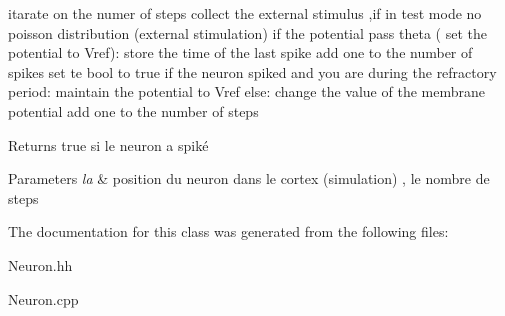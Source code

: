 itarate on the numer of steps collect the external stimulus ,if in test mode no poisson distribution (external stimulation) if the potential pass theta ( set the potential to Vref)\-: store the time of the last spike add one to the number of spikes set te bool to true if the neuron spiked and you are during the refractory period\-: maintain the potential to Vref else\-: change the value of the membrane potential add one to the number of steps \begin{DoxyReturn}{Returns}
true si le neuron a spiké 
\end{DoxyReturn}

\begin{DoxyParams}{Parameters}
{\em la} & position du neuron dans le cortex (simulation) , le nombre de steps \\
\hline
\end{DoxyParams}


The documentation for this class was generated from the following files\-:\begin{DoxyCompactItemize}
\item 
Neuron.\-hh\item 
Neuron.\-cpp\end{DoxyCompactItemize}
